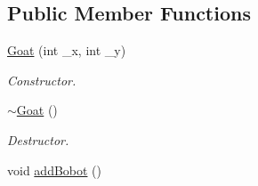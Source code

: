 \subsection*{Public Member Functions}
\begin{DoxyCompactItemize}
\item 
\hyperlink{classGoat_a31a4d452fe7142fbc5fb2c7799a1a5d7}{Goat} (int \-\_\-x, int \-\_\-y)
\begin{DoxyCompactList}\small\item\em Constructor. \end{DoxyCompactList}\item 
\hypertarget{classGoat_aef1721f83327b7e46da9ad26173b42f8}{\hyperlink{classGoat_aef1721f83327b7e46da9ad26173b42f8}{$\sim$\-Goat} ()}\label{classGoat_aef1721f83327b7e46da9ad26173b42f8}

\begin{DoxyCompactList}\small\item\em Destructor. \end{DoxyCompactList}\item 
\hypertarget{classGoat_aacc8a4aeec7323e627c5ce6d5433973a}{void \hyperlink{classGoat_aacc8a4aeec7323e627c5ce6d5433973a}{add\-Bobot} ()}\label{classGoat_aacc8a4aeec7323e627c5ce6d5433973a}


\end{DoxyCompactItemize}
